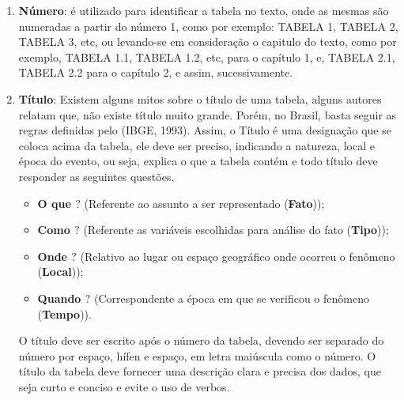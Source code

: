\begin{enumerate}
  \item \textbf{Número}: é utilizado para identificar a tabela no texto, onde as mesmas são numeradas a partir do número 1, como por exemplo: TABELA 1, TABELA 2, TABELA 3, etc, ou levando-se em consideração o capitulo do texto, como por exemplo, TABELA 1.1, TABELA 1.2, etc, para o capítulo 1, e, TABELA 2.1, TABELA 2.2 para o capítulo 2, e assim, sucessivamente.
  \item \textbf{Título}: Existem alguns mitos sobre o título de uma tabela, alguns autores relatam que, não existe título muito grande. Porém, no Brasil, basta seguir as regras definidas pelo (IBGE, 1993). Assim, o Título é uma designação que se coloca acima da tabela, ele deve ser preciso,
  indicando a natureza, local e época do evento, ou seja, explica o que a tabela contém e todo título deve responder as seguintes questões.

\begin{itemize}
  \item \textbf{O que $?$}  (Referente ao assunto a ser representado (\textbf{Fato}));
  \item \textbf{Como $?$}  (Referente as variáveis escolhidas para análise do fato (\textbf{Tipo}));
   \item \textbf{Onde $?$}   (Relativo ao lugar ou espaço geográfico onde ocorreu o fenômeno (\textbf{Local}));
    \item \textbf{Quando $?$} (Correspondente a época em que se verificou o fenômeno (\textbf{Tempo})).
\end{itemize}

O título deve ser escrito após o número da tabela, devendo ser separado do número por espaço, hífen e espaço, em letra maiúscula como o número. O título da tabela deve fornecer uma descrição clara e precisa dos dados, que seja curto e conciso e evite o uso de verbos.


\end{enumerate}
